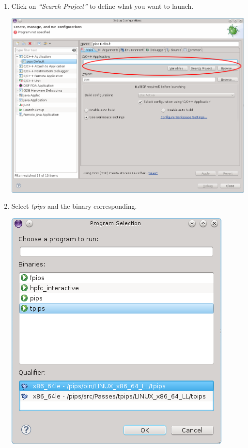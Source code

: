 \documentclass[a4paper]{article}
\begin{document}
\begin{enumerate}
\item Click on \emph{``Search Project''} to define what you want to launch.
\begin{center}
\noindent
\includegraphics[scale=0.4]{eclipse/07-eclipseJUNO-debug3.png}
\end{center}

\item Select \emph{tpips} and the binary corresponding.
\begin{center}
\noindent
\includegraphics[scale=0.4]{eclipse/07-eclipseJUNO-debug4.png}
\end{center}


\end{enumerate}
\end{document}
